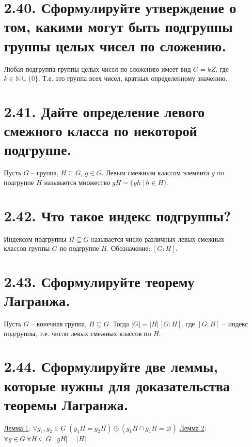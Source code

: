 \documentclass{article}
\begin{document}
\section*{\LARGE 2.40. Сформулируйте утверждение о том, какими могут быть подгруппы группы целых чисел по сложению.  }

Любая подгруппа группы целых чисел по сложению имеет вид $G = kZ$, где $k \in \mathbb{N}\cup\{0\}$. Т.е. это группа всех чисел, кратных определенному значению.

\section*{\LARGE 2.41. Дайте определение левого смежного класса по некоторой подгруппе. }

Пусть $G$ -- группа, $H \subseteq G$, $g \in G$. Левым смежным классом элемента $g$ по подгруппе $H$ называется множество $gH = \{gh \:|\: h \in H\}$.

\section*{\LARGE 2.42. Что такое индекс подгруппы? }

Индексом подгруппы $H \subseteq G$ называется число различных левых смежных классов группы $G$ по подгруппе $H$. Обозначение: $[G : H]$.

\section*{\LARGE 2.43. Сформулируйте теорему Лагранжа. }

Пусть $G$ -- конечная группа, $H \subseteq G$. Тогда $|G| = |H|[G : H]$, где $[G : H]$ -- индекс подгруппы, т.е. число левых смежных классов по $H$.

\section*{\LARGE 2.44. Сформулируйте две леммы, которые нужны для доказательства теоремы Лагранжа. }

\underline{Лемма 1}:
\newline $\forall g_1, g_2 \in G \; (g_1H = g_2H) \oplus (g_1H \cap g_1H = \varnothing)$
\newline \underline{Лемма 2}:
\newline $\forall g \in G \: \forall H \subseteq G \;\; |gH| = |H|$
\end{document}
